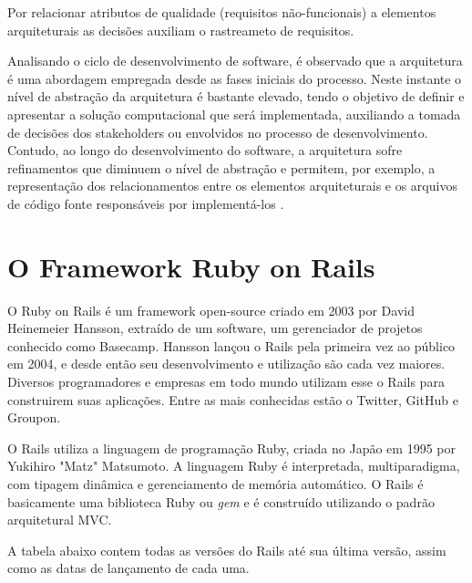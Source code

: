 Por relacionar atributos de qualidade (requisitos não-funcionais) a elementos arquiteturais as decisões auxiliam o rastreameto de requisitos.

Analisando o ciclo de desenvolvimento de software, é observado que a arquitetura é uma abordagem empregada desde as fases iniciais do processo. Neste instante o nível de abstração da arquitetura é bastante elevado, tendo o objetivo de definir e apresentar a solução computacional que será implementada, auxiliando a tomada de decisões dos stakeholders ou envolvidos no processo de desenvolvimento. Contudo, ao longo do desenvolvimento do software, a arquitetura sofre refinamentos que diminuem o nível de abstração e permitem, por exemplo, a representação dos relacionamentos entre os elementos arquiteturais e os arquivos de código fonte responsáveis por implementá-los \cite{clements2002documenting}.


\section{O Framework Ruby on Rails}

O Ruby on Rails é um framework open-source criado em 2003 por David Heinemeier Hansson, extraído de um software, um gerenciador de projetos conhecido como Basecamp.
Hansson lançou o Rails pela primeira vez ao público em 2004, e desde então seu desenvolvimento e utilização são cada vez maiores. Diversos programadores e empresas em todo mundo utilizam esse o Rails para construirem suas aplicações. Entre as mais conhecidas estão o Twitter, GitHub e Groupon. 

O Rails utiliza a linguagem de programação Ruby, criada no Japão em 1995 por Yukihiro "Matz" Matsumoto. A linguagem Ruby é interpretada, multiparadigma, com tipagem dinâmica e gerenciamento de memória automático. O Rails é basicamente uma biblioteca Ruby ou \textit{gem} e é construído utilizando o padrão arquitetural MVC.

A tabela abaixo contem todas as versões do Rails até sua última versão, assim como as datas de lançamento de cada uma.

